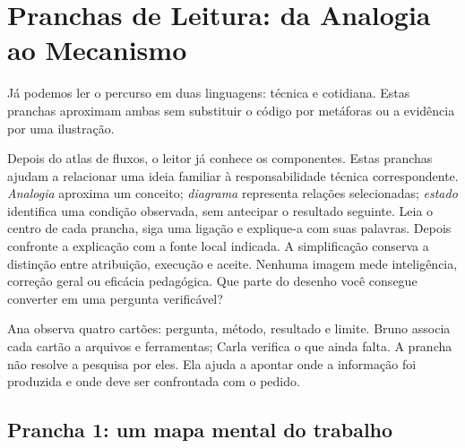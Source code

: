 \chapter{Pranchas de Leitura: da Analogia ao Mecanismo}

Já podemos ler o percurso em duas linguagens: técnica e cotidiana. Estas pranchas aproximam ambas sem substituir o código por metáforas ou a evidência por uma ilustração.


\roteirodidatico
{Depois do atlas de fluxos, o leitor já conhece os componentes. Estas pranchas ajudam a relacionar uma ideia familiar à responsabilidade técnica correspondente.}
{\emph{Analogia} aproxima um conceito; \emph{diagrama} representa relações selecionadas; \emph{estado} identifica uma condição observada, sem antecipar o resultado seguinte.}
{Leia o centro de cada prancha, siga uma ligação e explique-a com suas palavras. Depois confronte a explicação com a fonte local indicada.}
{A simplificação conserva a distinção entre atribuição, execução e aceite. Nenhuma imagem mede inteligência, correção geral ou eficácia pedagógica.}
{Que parte do desenho você consegue converter em uma pergunta verificável?}

{Ana observa quatro cartões: pergunta, método, resultado e limite. Bruno associa cada cartão a arquivos e ferramentas; Carla verifica o que ainda falta. A prancha não resolve a pesquisa por eles. Ela ajuda a apontar onde a informação foi produzida e onde deve ser confrontada com o pedido.}

\section{Prancha 1: um mapa mental do trabalho}

